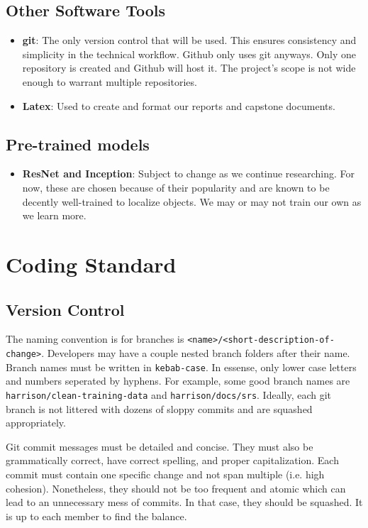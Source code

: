 \documentclass{article}
\begin{document}
\subsection{Other Software Tools}
\begin{itemize}
  \item \textbf{git}: The only version control that will be used. This ensures consistency and
  simplicity in the technical workflow. Github only uses git anyways. Only one repository is 
  created and Github will host it. The project's scope is not wide enough to warrant multiple 
  repositories.
  \item \textbf{Latex}: Used to create and format our reports and capstone documents.
\end{itemize}

\subsection{Pre-trained models}
\begin{itemize}
  \item \textbf{ResNet and Inception}: Subject to change as we continue researching. For now, these
    are chosen because of their popularity and are known to be decently well-trained to localize
    objects. We may or may not train our own as we learn more.
\end{itemize}


\section{Coding Standard}

\subsection{Version Control}
The naming convention is for branches is \verb|<name>/<short-description-of-change>|. 
Developers may have a couple nested branch folders after their name. Branch names must be written
in \verb|kebab-case|. In essense, only lower case letters and numbers seperated by hyphens.
For example, some good branch names are \verb|harrison/clean-training-data| and
\verb|harrison/docs/srs|. Ideally, each git branch is not littered with dozens of sloppy commits 
and are squashed appropriately.

Git commit messages must be detailed and concise. They must also be grammatically correct, have
correct spelling, and proper capitalization. Each commit must contain one specific change and not 
span multiple (i.e. high cohesion). Nonetheless, they should not be too frequent and atomic which
can lead to an unnecessary mess of commits. In that case, they should be squashed. It is up to 
each member to find the balance.
\end{document}
